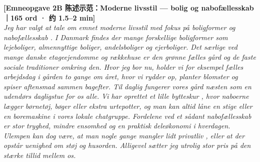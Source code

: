 
\begin{transbox}
\small
\textbf{\color{NCDNavy}[Emneopgave 2B 陈述示范：Moderne livsstil --- bolig og nabofællesskab｜165 ord · 约 1.5--2 min]}\\
\textit{Jeg har valgt at tale om emnet moderne livsstil  med fokus på boligformer og nabofællesskab . I Danmark findes der mange forskellige boligformer som lejeboliger, almennyttige boliger, andelsboliger og ejerboliger. Det særlige ved mange danske etageejendomme  og rækkehuse er den grønne fælles gård og de faste sociale traditioner omkring den. Hvor jeg bor nu, holder vi for eksempel fælles arbejdsdag i gården to gange om året, hvor vi rydder op, planter blomster og spiser aftensmad sammen bagefter. Til daglig fungerer vores gård næsten som en udendørs dagligstue for os alle. Vi har oprettet et lille bytteskur , hvor naboerne lægger børnetøj, bøger eller ekstra urtepotter, og man kan altid låne en stige eller en boremaskine i vores lokale chatgruppe. Fordelene ved et sådant nabofællesskab er stor tryghed, mindre ensomhed  og en praktisk deleøkonomi i hverdagen. Ulempen kan dog være, at man nogle gange mangler lidt privatliv , eller at der opstår uenighed om støj og husorden. Alligevel sætter jeg utrolig stor pris på den stærke tillid mellem os.}
\end{transbox}

